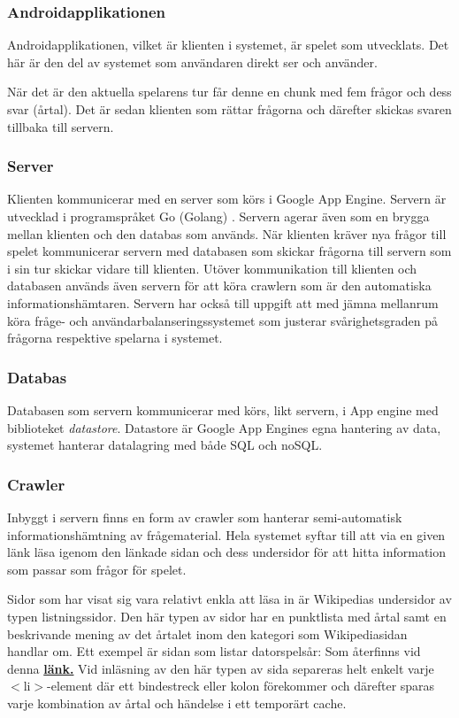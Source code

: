 \documentclass[12pt,a4paper]{article}
\begin{document}
\subsubsection{Androidapplikationen}
Androidapplikationen, vilket är klienten i systemet, är spelet som utvecklats. Det här är den del av systemet som användaren direkt ser och använder.

När det är den aktuella spelarens tur får denne en chunk med fem frågor och dess svar (årtal). Det är sedan klienten som rättar frågorna och därefter skickas svaren tillbaka till servern.
\subsubsection{Server}
Klienten kommunicerar med en server som körs i Google App Engine. Servern är utvecklad i programspråket Go (Golang) \cite{golang}. Servern agerar även som en brygga mellan klienten och den databas som används. När klienten kräver nya frågor till spelet kommunicerar servern med databasen som skickar frågorna till servern som i sin tur skickar vidare till klienten. Utöver kommunikation till klienten och databasen används även servern för att köra crawlern som är den automatiska informationshämtaren. Servern har också till uppgift att med jämna mellanrum köra fråge- och användarbalanseringssystemet som justerar svårighetsgraden på frågorna respektive spelarna i systemet. 
\subsubsection{Databas}
Databasen som servern kommunicerar med körs, likt servern, i App engine med biblioteket \textit{datastore}. Datastore är Google App Engines egna hantering av data, systemet hanterar datalagring med både SQL och noSQL.
\subsubsection{Crawler}
Inbyggt i servern finns en form av crawler som hanterar semi-automatisk informationshämtning av frågematerial. Hela systemet syftar till att via en given länk läsa igenom den länkade sidan och dess undersidor för att hitta information som passar som frågor för spelet. 

Sidor som har visat sig vara relativt enkla att läsa in är Wikipedias undersidor av typen listningssidor. Den här typen av sidor har en punktlista med årtal samt en beskrivande mening av det årtalet inom den kategori som Wikipediasidan handlar om. Ett exempel är sidan som listar datorspelsår: Som återfinns vid denna  \textbf{\href{http://sv.wikipedia.org/wiki/Lista_\%C3\%B6ver_datorspels\%C3\%A5r}{länk.}} 
Vid inläsning av den här typen av sida separeras helt enkelt varje $<$li$>$-element där ett bindestreck eller kolon förekommer och därefter sparas varje kombination av årtal och händelse i ett temporärt cache.
\end{document}
